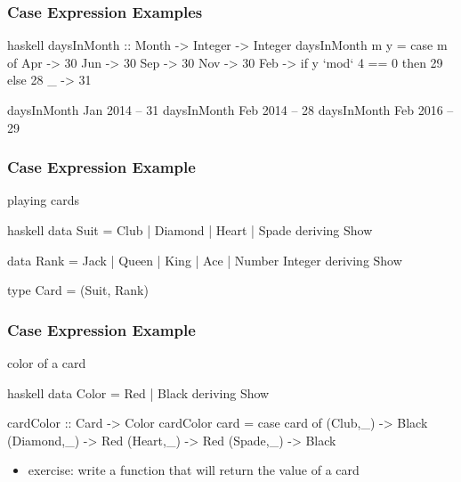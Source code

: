 \documentclass[dvipsnames]{beamer}
\theoremstyle{plain}
\begin{document}
\begin{frame}[fragile]
  \frametitle{Case Expression Examples}

  \begin{example}
    \begin{pygments}{haskell}
daysInMonth :: Month -> Integer -> Integer
daysInMonth m y =
    case m of
      Apr -> 30
      Jun -> 30
      Sep -> 30
      Nov -> 30
      Feb -> if y `mod` 4 == 0 then 29 else 28
      _ -> 31

daysInMonth Jan 2014 -- 31
daysInMonth Feb 2014 -- 28
daysInMonth Feb 2016 -- 29
    \end{pygments}
  \end{example}
\end{frame}

\begin{frame}[fragile]
  \frametitle{Case Expression Example}

  \begin{exampleblock}{playing cards}
    \begin{pygments}{haskell}
data Suit = Club | Diamond | Heart | Spade
            deriving Show

data Rank = Jack | Queen | King | Ace | Number Integer
            deriving Show

type Card = (Suit, Rank)
    \end{pygments}
  \end{exampleblock}
\end{frame}

\begin{frame}[fragile]
  \frametitle{Case Expression Example}

  \begin{exampleblock}{color of a card}
    \begin{pygments}{haskell}
data Color = Red | Black
             deriving Show

cardColor :: Card -> Color
cardColor card =
    case card of
      (Club,_) -> Black
      (Diamond,_) -> Red
      (Heart,_) -> Red
      (Spade,_) -> Black
    \end{pygments}
  \end{exampleblock}

  \pause
  \begin{itemize}
    \item exercise: write a function that will return the value of a card
  \end{itemize}
\end{frame}
\end{document}
